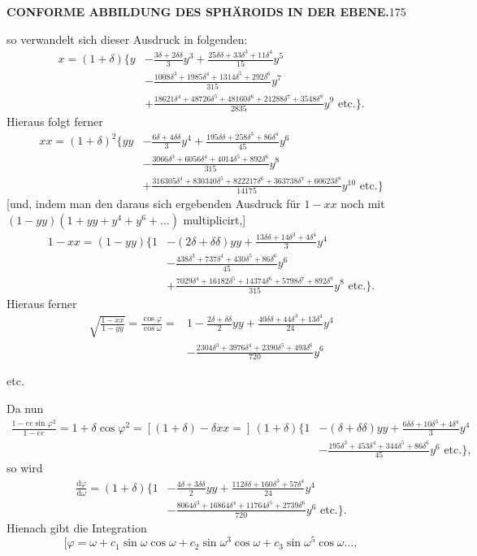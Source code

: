 \par\clearpage
\noindent\null\hfill{\small\textbf{CONFORME ABBILDUNG DES SPHÄROIDS IN DER EBENE.}}\hfill175\par\medskip
\noindent so verwandelt sich dieser Ausdruck in folgenden:
\[
\begin{aligned}
x=(1+\delta)\biggl\{y&-\frac{3\delta+2\delta\delta}{3}y^3+\frac{25\delta\delta+33\delta^3+11\delta^4}{15}y^5\\
&-\frac{1008\delta^3+1985\delta^4+1314\delta^5+292\delta^6}{315}y^7\\
&+\frac{18621\delta^4+48726\delta^5+48160\delta^6+21288\delta^7+3548\delta^8}{2835}y^9\text{ etc.}\biggr\}.
\end{aligned}
\]
Hieraus folgt ferner
\[
\begin{aligned}
xx=(1+\delta)^2\biggl\{yy&-\frac{6\delta+4\delta\delta}{3}y^4+\frac{195\delta\delta+258\delta^3+86\delta^4}{45}y^6\\
&-\frac{3066\delta^3+6056\delta^4+4014\delta^5+892\delta^6}{315}y^8\\
&+\frac{316305\delta^4+830340\delta^5+822217\delta^6+363738\delta^7+60623\delta^8}{14175}y^{10}\text{ etc.}\biggr\}
\end{aligned}
\]
[und, indem man den daraus sich ergebenden Ausdruck für \(1-xx\) noch mit \((1-yy)(1+yy+y^4+y^6+\ldots)\) multiplicirt,]
\[
\begin{aligned}
1-xx=(1-yy)\biggl\{1&-(2\delta+\delta\delta)yy+\frac{13\delta\delta+14\delta^3+4\delta^4}{3}y^4\\
&-\frac{438\delta^3+737\delta^4+430\delta^5+86\delta^6}{45}y^6\\
&+\frac{7029\delta^4+16182\delta^5+14374\delta^6+5798\delta^7+892\delta^8}{315}y^8\text{ etc.}\biggr\}.
\end{aligned}
\]
Hieraus ferner
\[
\begin{aligned}
\sqrt{\frac{1-xx}{1-yy}}=\frac{\cos\varphi}{\cos\omega}={}&1-\frac{2\delta+\delta\delta}{2}yy+\frac{40\delta\delta+44\delta^3+13\delta^4}{24}y^4\\
&-\frac{2304\delta^3+3976\delta^4+2390\delta^5+493\delta^6}{720}y^6
\end{aligned}
\]
{\centering etc.\par}
Da nun
\[
\begin{aligned}
\frac{1-ee\sin\varphi^2}{1-ee}=1+\delta\cos\varphi^2=[(1+\delta)-\delta xx={}]\,(1+\delta)\biggl\{1&-(\delta+\delta\delta)yy+\frac{6\delta\delta+10\delta^3+4\delta^4}{3}y^4\\
&-\frac{195\delta^3+453\delta^4+344\delta^5+86\delta^6}{45}y^6\text{ etc.}\biggr\},
\end{aligned}
\]
\noindent so wird
\[
\begin{aligned}
\frac{\mathrm d\varphi}{\mathrm d\omega}=(1+\delta)\biggl\{1&-\frac{4\delta+3\delta\delta}{2}yy+\frac{112\delta\delta+160\delta^3+57\delta^4}{24}y^4\\
&-\frac{8064\delta^3+16864\delta^4+11764\delta^5+2739\delta^6}{720}y^6\text{ etc.}\biggr\}.
\end{aligned}
\]
Hienach gibt die Integration
\[ [\varphi=\omega+c_1\sin\omega\cos\omega+c_2\sin\omega^3\cos\omega+c_3\sin\omega^5\cos\omega\ldots,\]

